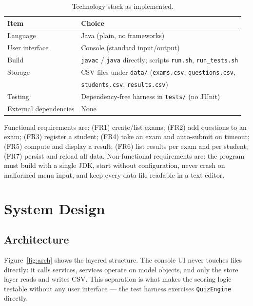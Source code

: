 \documentclass[11pt,a4paper]{article}
\begin{document}
\begin{table}[H]
\centering
\caption{Technology stack as implemented.}
\label{tab:stack}
\begin{tabular}{@{}ll@{}}
\toprule
\textbf{Item} & \textbf{Choice} \\
\midrule
Language & Java (plain, no frameworks) \\
User interface & Console (standard input/output) \\
Build & \texttt{javac} / \texttt{java} directly; scripts \texttt{run.sh}, \texttt{run\_tests.sh} \\
Storage & CSV files under \texttt{data/} (\texttt{exams.csv}, \texttt{questions.csv}, \\
& \texttt{students.csv}, \texttt{results.csv}) \\
Testing & Dependency-free harness in \texttt{tests/} (no JUnit) \\
External dependencies & None \\
\bottomrule
\end{tabular}
\end{table}

Functional requirements are: (FR1) create/list exams; (FR2) add questions to an
exam; (FR3) register a student; (FR4) take an exam and auto-submit on timeout;
(FR5) compute and display a result; (FR6) list results per exam and per student;
(FR7) persist and reload all data. Non-functional requirements are: the program
must build with a single JDK, start without configuration, never crash on
malformed menu input, and keep every data file readable in a text editor.

\section{System Design}
\subsection{Architecture}
Figure~\ref{fig:arch} shows the layered structure. The console UI never touches
files directly: it calls services, services operate on model objects, and only the
store layer reads and writes CSV. This separation is what makes the scoring logic
testable without any user interface --- the test harness exercises
\texttt{QuizEngine} directly.
\end{document}
